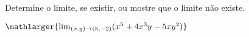 Determine o limite, se existir, ou mostre que o limite não existe.

 $\mathlarger{\lim_{(x,y)\rightarrow(5,-2)} (x^5+4x^3y-5xy^2)}$
